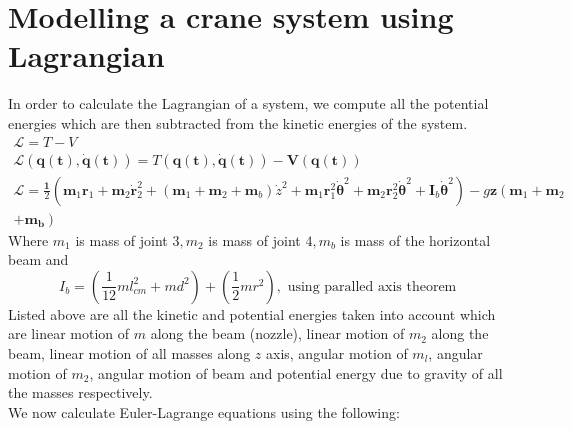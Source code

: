 \documentclass{UoNMCHA}
\numberwithin{equation}{section}
\begin{document}
	
	\section{Modelling a crane system using Lagrangian}
	
	In order to calculate the Lagrangian of a system, we compute all the potential energies which are then
	subtracted from the kinetic energies of the system.
	$$
	\begin{array}{c}
	\mathcal{L}=T-V \\
	\mathcal{L}(\boldsymbol{q}(\boldsymbol{t}), \dot{\boldsymbol{q}}(\boldsymbol{t}))=T(\boldsymbol{q}(\boldsymbol{t}), \dot{\boldsymbol{q}}(\boldsymbol{t}))-\boldsymbol{V}(\boldsymbol{q}(\boldsymbol{t})) \\
	\mathcal{L}=\frac{\mathbf{1}}{2}\left(\boldsymbol{m}_{1} \boldsymbol{r}_{1}+\boldsymbol{m}_{2} \dot{\boldsymbol{r}}_{2}^{2}+\left(\boldsymbol{m}_{1}+\boldsymbol{m}_{2}+\boldsymbol{m}_{b}\right) \dot{z}^{2}+\boldsymbol{m}_{1} \boldsymbol{r}_{1}^{2} \dot{\boldsymbol{\theta}}^{2}+\boldsymbol{m}_{2} \boldsymbol{r}_{2}^{2} \dot{\boldsymbol{\theta}}^{2}+\boldsymbol{I}_{b} \dot{\boldsymbol{\theta}}^{2}\right)-g \mathbf{z}\left(\boldsymbol{m}_{1}+\boldsymbol{m}_{2}\right. \\
	\left.+\boldsymbol{m}_{\boldsymbol{b}}\right)
	\end{array}
	$$
	Where $m_{1}$ is mass of joint $3, m_{2}$ is mass of joint $4, m_{b}$ is mass of the horizontal beam and
	$$
	I_{b}=\left(\frac{1}{12} m l_{c m}^{2}+m d^{2}\right)+\left(\frac{1}{2} m r^{2}\right), \text { using paralled axis theorem }
	$$
	Listed above are all the kinetic and potential energies taken into account which are linear motion of $m$
	along the beam (nozzle), linear motion of $m_{2}$ along the beam, linear motion of all masses along $z$ axis,
	angular motion of $m_{l}$, angular motion of $m_{2}$, angular motion of beam and potential energy due to
	gravity of all the masses respectively. \\
	We now calculate Euler-Lagrange equations using the following:
\end{document}
